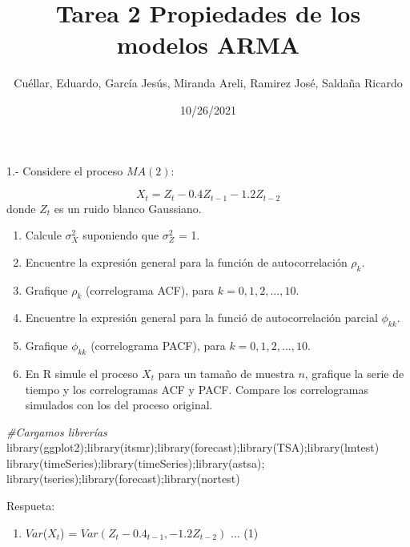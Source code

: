 \documentclass[
]{article}
\title{Tarea 2 Propiedades de los modelos ARMA}
\author{Cuéllar, Eduardo, García Jesús, Miranda Areli, Ramirez José,
Saldaña Ricardo}
\date{10/26/2021}
\newenvironment{Shaded}{\begin{snugshade}}{\end{snugshade}}
\newcommand{\CommentTok}[1]{\textcolor[rgb]{0.56,0.35,0.01}{\textit{#1}}}
\newcommand{\FunctionTok}[1]{\textcolor[rgb]{0.00,0.00,0.00}{#1}}
\newcommand{\NormalTok}[1]{#1}
\providecommand{\tightlist}{%
  \setlength{\itemsep}{0pt}\setlength{\parskip}{0pt}}
\begin{document}
\maketitle

1.- Considere el proceso \(MA(2)\):

\[ X_t = Z_t - 0.4Z_{t-1} - 1.2Z_{t-2} \] donde \({Z_{t}}\) es un ruido
blanco Gaussiano.

\begin{enumerate}
\def\labelenumi{(\alph{enumi})}
\tightlist
\item
  Calcule \(\sigma^{2}_{X}\) suponiendo que \(\sigma^{2}_{Z}\) = 1.
\item
  Encuentre la expresión general para la función de autocorrelación
  \(\rho_{k}\).
\item
  Grafique \(\rho_{k}\) (correlograma ACF), para \(k= 0,1,2,...,10\).
\item
  Encuentre la expresión general para la funció de autocorrelación
  parcial \(\phi_{kk}\).
\item
  Grafique \(\phi_{kk}\) (correlograma PACF), para \(k = 0,1,2,...,10\).
\item
  En R simule el proceso \({X_{t}}\) para un tamaño de muestra \(n\),
  grafique la serie de tiempo y los correlogramas ACF y PACF. Compare
  los correlogramas simulados con los del proceso original.
\end{enumerate}

\begin{Shaded}
\begin{Highlighting}[]
\CommentTok{\#Cargamos librerías}
\FunctionTok{library}\NormalTok{(ggplot2);}\FunctionTok{library}\NormalTok{(itsmr);}\FunctionTok{library}\NormalTok{(forecast);}\FunctionTok{library}\NormalTok{(TSA);}\FunctionTok{library}\NormalTok{(lmtest)}
\FunctionTok{library}\NormalTok{(timeSeries);}\FunctionTok{library}\NormalTok{(timeSeries);}\FunctionTok{library}\NormalTok{(astsa);}
\FunctionTok{library}\NormalTok{(tseries);}\FunctionTok{library}\NormalTok{(forecast);}\FunctionTok{library}\NormalTok{(nortest)}
\end{Highlighting}
\end{Shaded}

Respueta:

\begin{enumerate}
\def\labelenumi{\alph{enumi})}
\tightlist
\item
  \(Var\)(\(X_{t}\)) = \(Var(Z_{t} - 0.4_{t-1}, - 1.2Z_{t-2})\)
  \(\dots\) (1)
\end{enumerate}
\end{document}
